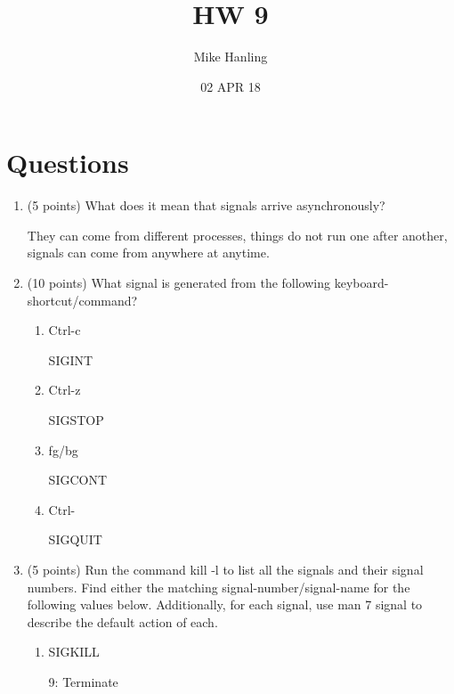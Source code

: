 \documentclass{article}[9pt]
\title{HW 9}
\author{Mike Hanling}
\date{02 APR 18}
\newenvironment{myanswer}{\begin{mdframed}\begin{answerfont}}{\end{answerfont}\end{mdframed}}
\begin{document}
\maketitle
\section*{Questions}
\label{sec:orgfce6862}
\begin{enumerate}


\item (5 points) What does it mean that signals arrive
asynchronously?
\begin{myanswer}
They can come from different processes, things do not run one after
another, signals can come from anywhere at anytime.
\end{myanswer}

\item (10 points) What signal is generated from the following keyboard-shortcut/command?

\begin{enumerate}
\item Ctrl-c
\begin{myanswer}
SIGINT
\end{myanswer}

\item Ctrl-z
\begin{myanswer}
SIGSTOP
\end{myanswer}

\item fg/bg
\begin{myanswer}
SIGCONT
\end{myanswer}

\item Ctrl-\
\begin{myanswer}
SIGQUIT
\end{myanswer}

\end{enumerate}
\item (5 points) Run the command kill -l to list all the signals and their
signal numbers. Find either the matching
signal-number/signal-name for the following values
below. Additionally, for each signal, use man 7 signal to
describe the default action of each.


\begin{enumerate}
\item SIGKILL
\begin{myanswer}
9: Terminate
\end{myanswer}


\end{enumerate}
\end{enumerate}
\end{document}
